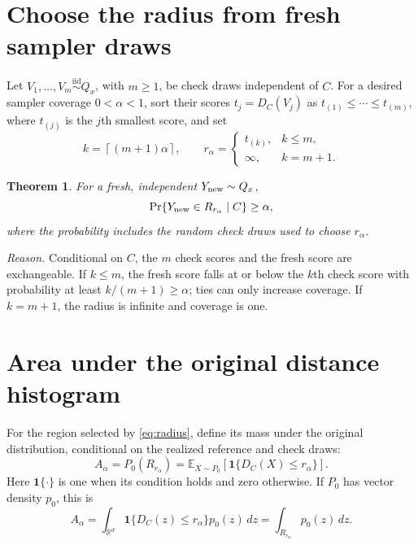 \documentclass[10pt,letterpaper]{article}
\theoremstyle{typed}
\newtheorem{theorem}{Theorem}
\begin{document}
\section{Choose the radius from fresh sampler draws}

Let $V_1,\ldots,V_m\overset{\mathrm{iid}}{\sim}Q_x$, with $m\geq1$, be check draws independent of $C$. For a desired sampler coverage $0<\alpha<1$, sort their scores $t_j=D_C(V_j)$ as $t_{(1)}\leq\cdots\leq t_{(m)}$, where $t_{(j)}$ is the $j$th smallest score, and set
\begin{equation}
  k=\left\lceil(m+1)\alpha\right\rceil,\qquad
  r_\alpha=\begin{cases}t_{(k)},&k\leq m,\\ \infty,&k=m+1.\end{cases}
  \label{eq:radius}
\end{equation}

\begin{theorem}
For a fresh, independent $Y_{\rm new}\sim Q_x$,
\begin{equation}
  \Pr\{Y_{\rm new}\in R_{r_\alpha}\mid C\}\geq\alpha,
  \label{eq:coverage}
\end{equation}
where the probability includes the random check draws used to choose $r_\alpha$.
\end{theorem}

\emph{Reason.} Conditional on $C$, the $m$ check scores and the fresh score are exchangeable. If $k\leq m$, the fresh score falls at or below the $k$th check score with probability at least $k/(m+1)\geq\alpha$; ties can only increase coverage. If $k=m+1$, the radius is infinite and coverage is one.

\newpage
\thispagestyle{fancy}
\section{Area under the original distance histogram}

For the region selected by \eqref{eq:radius}, define its mass under the original distribution, conditional on the realized reference and check draws:
\begin{equation}
  \boxed{\quad A_\alpha=P_0(R_{r_\alpha})
  =\mathbb{E}_{X\sim P_0}\!\left[\mathbf{1}\{D_C(X)\leq r_\alpha\}\right].\quad}
  \label{eq:mass}
\end{equation}
Here $\mathbf{1}\{\cdot\}$ is one when its condition holds and zero otherwise.
If $P_0$ has vector density $p_0$, this is
\begin{equation}
  A_\alpha=\int_{\mathbb{R}^d}\mathbf{1}\{D_C(z)\leq r_\alpha\}p_0(z)\,dz
  =\int_{R_{r_\alpha}}p_0(z)\,dz.
  \label{eq:integral}
\end{equation}
\end{document}
